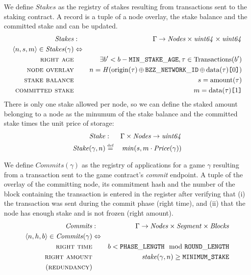 \begin{definition}
\label{def:stakes}
We define $\mathit{Stakes}$ as the registry of stakes resulting from transactions sent to the staking contract. A record is a tuple of a node overlay, the stake balance and the committed stake and can be updated.  
%
\begin{eqnarray}
\mathit{Stakes}&:&\Gamma\to\mathit{Nodes}\times\mathit{uint64}\times\mathit{uint64}\\
\langle n, s, m\rangle\in\mathit{Stakes}(\gamma)&\Leftrightarrow& \\
\textsc{right age}&&\exists b'<b-\mathtt{MIN\_STAKE\_AGE}, \tau\in\mathrm{Transactions}(b') \\
\textsc{node overlay}&& n = \mathit{H}(\mathrm{origin}(\tau)\operatorname{\operatorname{\oplus}}\mathtt{BZZ\_NETWORK\_ID}\operatorname{\operatorname{\oplus}}\mathrm{data}(\tau)\texttt{[}\/0\/\texttt{]})\\
\textsc{stake balance}&& s=\mathrm{amount}(\tau)\\
\textsc{committed stake}&& m=\mathrm{data}(\tau)\texttt{[}\/1\/\texttt{]}
\end{eqnarray}
%
There is only one stake allowed per node, so we can define the staked amount belonging to a node as the minumum of the stake balance and the committed stake times the unit price of storage:
% 
\begin{eqnarray}
\mathit{Stake}&:&\Gamma\times\mathit{Nodes}\to\mathit{uint64}\\
\mathit{Stake}(\gamma,n)&\overset{\textrm{\tiny def}}{=}&\mathit{min}(s,m\cdot \mathit{Price}(\gamma))
\end{eqnarray}
%
\end{definition}

\begin{definition}
\label{def:commits}
We define $\mathit{Commits}(\gamma)$ as the registry of applications for a game $\gamma$ resulting from a transaction sent to the game contract's \emph{commit} endpoint. A tuple of the overlay of the committing node, its commitment hash and the number of the block containing the transaction is entered in the register after verifying that (i) the transaction was sent during the commit phase (right time), and (ii) that the node has enough stake and is not frozen (right amount).                    
%
\begin{eqnarray}
\mathit{Commits}&:&\Gamma\to\mathit{Nodes}\times\mathit{Segment}\times\mathit{Blocks}\\
\langle n,h,b\rangle\in\mathit{Commits}(\gamma)&\Leftrightarrow&%
\\
\textsc{right time}
&&b < \mathtt{PHASE\_LENGTH} \mod \mathtt{ROUND\_LENGTH} \\
\textsc{right amount}&&\mathit{stake}(\gamma,n)\geq \texttt{MINIMUM\_STAKE}\\
(\textsc{redundancy})&&
\end{eqnarray}
\end{definition}

